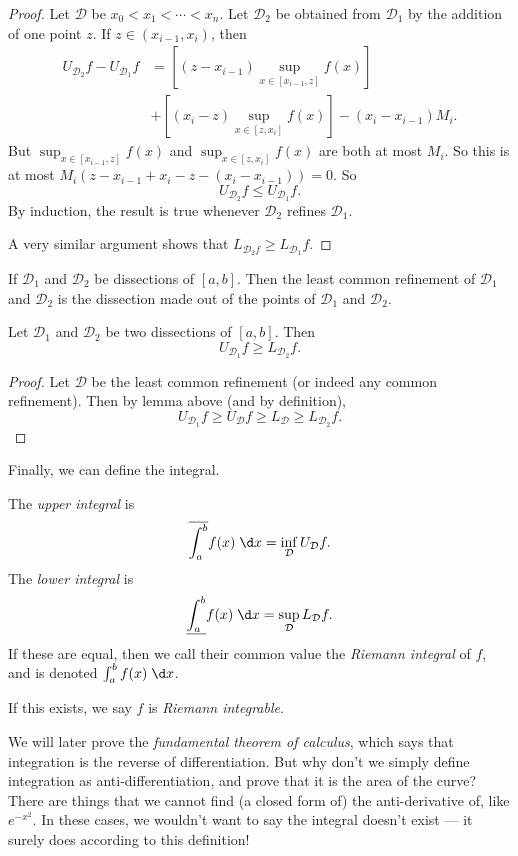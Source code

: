 \documentclass[a4paper]{article}
\begin{document}
\begin{proof}
  Let $\mathcal{D}$ be $x_0 < x_1 < \cdots < x_n$. Let $\mathcal{D}_2$ be obtained from $\mathcal{D}_1$ by the addition of one point $z$. If $z\in (x_{i - 1}, x_i)$, then
  \begin{align*}
    U_{\mathcal{D}_2}f - U_{\mathcal{D}_1}f &= \left[(z - x_{i - 1}) \sup_{x\in [x_{i - 1}, z]} f(x)\right]\\
    &+ \left[(x_i - z)\sup_ {x\in[z, x_i]}f(x)\right] - (x_i - x_{i - 1})M_i.
  \end{align*}
  But $\sup_{x\in [x_{i - 1}, z]} f(x)$ and $\sup_{x\in [z, x_i]} f(x)$ are both at most $M_i$. So this is at most $M_i( z - x_{i - 1} + x_i - z - (x_i - x_{i - 1})) =0 $. So
  \[
    U_{\mathcal{D}_2} f\leq U_{\mathcal{D}_1}f.
  \]
  By induction, the result is true whenever $\mathcal{D}_2$ refines $\mathcal{D}_1$.

  A very similar argument shows that $L_{\mathcal{D}_2f} \geq L_{\mathcal{D}_1}f$.
\end{proof}
\begin{defi}
  If $\mathcal{D}_1$ and $\mathcal{D}_2$ be dissections of $[a, b]$. Then the least common refinement of $\mathcal{D}_1$ and $\mathcal{D}_2$ is the dissection made out of the points of $\mathcal{D}_1$ and $\mathcal{D}_2$.
\end{defi}

\begin{cor}
  Let $\mathcal{D}_1$ and $\mathcal{D}_2$ be two dissections of $[a, b]$. Then
  \[
    U_{\mathcal{D}_1}f \geq L_{\mathcal{D}_2}f.
  \]
\end{cor}
\begin{proof}
  Let $\mathcal{D}$ be the least common refinement (or indeed any common refinement). Then by lemma above (and by definition),
  \[
    U_{\mathcal{D}_1}f \geq U_{\mathcal{D}}f \geq L_{\mathcal{D}} \geq L_{\mathcal{D}_2}f.
  \]
\end{proof}

Finally, we can define the integral.
\begin{defi}
  The \emph{upper integral} is
  \[
    \overline{\int_a^b} f(x)\;\d x = \inf_{\mathcal{D}}U_{\mathcal{D}}f.
  \]
  The \emph{lower integral} is
  \[
    \underline{\int_a^b} f(x)\;\d x = \sup_{\mathcal{D}}L_{\mathcal{D}}f.
  \]
  If these are equal, then we call their common value the \emph{Riemann integral} of $f$, and is denoted $\int_a^b f(x)\;\d x$.

  If this exists, we say $f$ is \emph{Riemann integrable}.
\end{defi}
We will later prove the \emph{fundamental theorem of calculus}, which says that integration is the reverse of differentiation. But why don't we simply define integration as anti-differentiation, and prove that it is the area of the curve? There are things that we cannot find (a closed form of) the anti-derivative of, like $e^{-x^2}$. In these cases, we wouldn't want to say the integral doesn't exist --- it surely does according to this definition!
\end{document}
